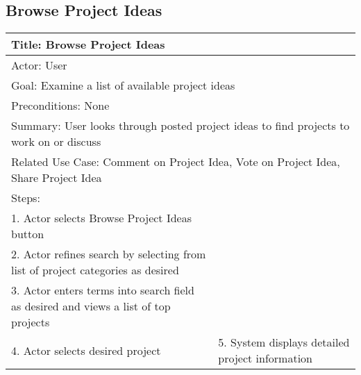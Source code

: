 \documentclass[10pt,a4paper]{article}
\begin{document}
\subsection{Browse Project Ideas}
\begin{tabular}{|p{6cm}|p{6cm}|} \hline
\multicolumn{2}{|l|}{Title: Browse Project Ideas}                                                                                       \\ \hline
\multicolumn{2}{|l|}{Actor: User}                                                                                                       \\ \hline
\multicolumn{2}{|l|}{Goal: Examine a list of available project ideas}                                                                 \\ \hline
\multicolumn{2}{|l|}{Preconditions: None}                                                                                               \\ \hline
\multicolumn{2}{|p{12cm}|}{Summary: User looks through posted project ideas to find projects to work on or discuss}                           \\ \hline
\multicolumn{2}{|p{12cm}|}{Related Use Case: Comment on Project Idea, Vote on Project Idea, Share Project Idea}                               \\ \hline
Steps:                                                                              &                                                 \\ \hline
1. Actor selects Browse Project Ideas button                                         &                                                 \\ \hline
2. Actor refines search by selecting from list of project categories as desired     &                                                 \\ \hline
3. Actor enters terms into search field as desired and views a list of top projects &                                                 \\ \hline
4. Actor selects desired project                                                    & 5. System displays detailed project information \\ \hline
\end{tabular}
\end{document}
